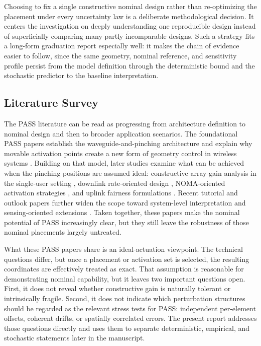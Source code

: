 Choosing to fix a single constructive nominal design rather than re-optimizing the placement under every uncertainty law is a deliberate methodological decision. It centers the investigation on deeply understanding one reproducible design instead of superficially comparing many partly incomparable designs. Such a strategy fits a long-form graduation report especially well: it makes the chain of evidence easier to follow, since the same geometry, nominal reference, and sensitivity profile persist from the model definition through the deterministic bound and the stochastic predictor to the baseline interpretation.


\subsection{Literature Survey}

The PASS literature can be read as progressing from architecture definition to nominal design and then to broader application scenarios. The foundational PASS papers establish the waveguide-and-pinching architecture and explain why movable activation points create a new form of geometry control in wireless systems \cite{fukuda2022pinching,ding2025perspective}. Building on that model, later studies examine what can be achieved when the pinching positions are assumed ideal: constructive array-gain analysis in the single-user setting \cite{ouyang2025array}, downlink rate-oriented design \cite{xu2025downlink}, NOMA-oriented activation strategies \cite{wang2025noma}, and uplink fairness formulations \cite{tegos2025uplink}. Recent tutorial and outlook papers further widen the scope toward system-level interpretation and sensing-oriented extensions \cite{ding2025isac,liu2026tutorial}. Taken together, these papers make the nominal potential of PASS increasingly clear, but they still leave the robustness of those nominal placements largely untreated.

What these PASS papers share is an ideal-actuation viewpoint. The technical questions differ, but once a placement or activation set is selected, the resulting coordinates are effectively treated as exact. That assumption is reasonable for demonstrating nominal capability, but it leaves two important questions open. First, it does not reveal whether constructive gain is naturally tolerant or intrinsically fragile. Second, it does not indicate which perturbation structures should be regarded as the relevant stress tests for PASS: independent per-element offsets, coherent drifts, or spatially correlated errors. The present report addresses those questions directly and uses them to separate deterministic, empirical, and stochastic statements later in the manuscript.

